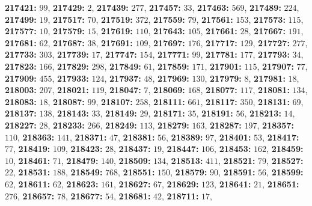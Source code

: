 \textsf{\bfseries 217421:} $99$, \textsf{\bfseries 217429:} $2$, \textsf{\bfseries 217439:} $277$, \textsf{\bfseries 217457:} $33$, \textsf{\bfseries 217463:} $569$, \textsf{\bfseries 217489:} $224$, \textsf{\bfseries 217499:} $19$, \textsf{\bfseries 217517:} $70$, \textsf{\bfseries 217519:} $372$, \textsf{\bfseries 217559:} $79$, \textsf{\bfseries 217561:} $153$, \textsf{\bfseries 217573:} $115$, \textsf{\bfseries 217577:} $10$, \textsf{\bfseries 217579:} $15$, \textsf{\bfseries 217619:} $110$, \textsf{\bfseries 217643:} $105$, \textsf{\bfseries 217661:} $28$, \textsf{\bfseries 217667:} $191$, \textsf{\bfseries 217681:} $62$, \textsf{\bfseries 217687:} $38$, \textsf{\bfseries 217691:} $109$, \textsf{\bfseries 217697:} $176$, \textsf{\bfseries 217717:} $129$, \textsf{\bfseries 217727:} $277$, \textsf{\bfseries 217733:} $303$, \textsf{\bfseries 217739:} $17$, \textsf{\bfseries 217747:} $154$, \textsf{\bfseries 217771:} $99$, \textsf{\bfseries 217781:} $177$, \textsf{\bfseries 217793:} $34$, \textsf{\bfseries 217823:} $166$, \textsf{\bfseries 217829:} $298$, \textsf{\bfseries 217849:} $61$, \textsf{\bfseries 217859:} $171$, \textsf{\bfseries 217901:} $115$, \textsf{\bfseries 217907:} $77$, \textsf{\bfseries 217909:} $455$, \textsf{\bfseries 217933:} $124$, \textsf{\bfseries 217937:} $48$, \textsf{\bfseries 217969:} $130$, \textsf{\bfseries 217979:} $8$, \textsf{\bfseries 217981:} $18$, \textsf{\bfseries 218003:} $207$, \textsf{\bfseries 218021:} $119$, \textsf{\bfseries 218047:} $7$, \textsf{\bfseries 218069:} $168$, \textsf{\bfseries 218077:} $117$, \textsf{\bfseries 218081:} $134$, \textsf{\bfseries 218083:} $18$, \textsf{\bfseries 218087:} $99$, \textsf{\bfseries 218107:} $258$, \textsf{\bfseries 218111:} $661$, \textsf{\bfseries 218117:} $350$, \textsf{\bfseries 218131:} $69$, \textsf{\bfseries 218137:} $138$, \textsf{\bfseries 218143:} $33$, \textsf{\bfseries 218149:} $29$, \textsf{\bfseries 218171:} $35$, \textsf{\bfseries 218191:} $56$, \textsf{\bfseries 218213:} $14$, \textsf{\bfseries 218227:} $28$, \textsf{\bfseries 218233:} $266$, \textsf{\bfseries 218249:} $113$, \textsf{\bfseries 218279:} $163$, \textsf{\bfseries 218287:} $197$, \textsf{\bfseries 218357:} $110$, \textsf{\bfseries 218363:} $141$, \textsf{\bfseries 218371:} $47$, \textsf{\bfseries 218381:} $56$, \textsf{\bfseries 218389:} $97$, \textsf{\bfseries 218401:} $53$, \textsf{\bfseries 218417:} $77$, \textsf{\bfseries 218419:} $109$, \textsf{\bfseries 218423:} $28$, \textsf{\bfseries 218437:} $19$, \textsf{\bfseries 218447:} $106$, \textsf{\bfseries 218453:} $162$, \textsf{\bfseries 218459:} $10$, \textsf{\bfseries 218461:} $71$, \textsf{\bfseries 218479:} $140$, \textsf{\bfseries 218509:} $134$, \textsf{\bfseries 218513:} $411$, \textsf{\bfseries 218521:} $79$, \textsf{\bfseries 218527:} $22$, \textsf{\bfseries 218531:} $188$, \textsf{\bfseries 218549:} $768$, \textsf{\bfseries 218551:} $150$, \textsf{\bfseries 218579:} $90$, \textsf{\bfseries 218591:} $56$, \textsf{\bfseries 218599:} $62$, \textsf{\bfseries 218611:} $62$, \textsf{\bfseries 218623:} $161$, \textsf{\bfseries 218627:} $67$, \textsf{\bfseries 218629:} $123$, \textsf{\bfseries 218641:} $21$, \textsf{\bfseries 218651:} $276$, \textsf{\bfseries 218657:} $78$, \textsf{\bfseries 218677:} $54$, \textsf{\bfseries 218681:} $42$, \textsf{\bfseries 218711:} $17$, 
